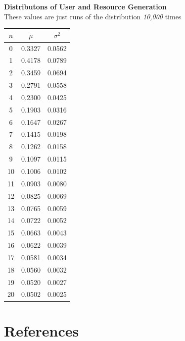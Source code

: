 \documentclass[12pt,a4paper]{report}
\begin{document}
\begin{center}
\large
\textup{\textbf{Distributons of User and Resource Generation\\}}
\normalsize
\textup{These values are just runs of the distribution \emph{10,000} times}
\begin{tabular}{|c|c|c|}
\hline
\textbf{$n$} & \textbf{$\mu$} & \textbf{$\sigma^2$} \\
\hline
0 & 0.3327 & 0.0562\\
\hline
1 & 0.4178 & 0.0789 \\
\hline
2 & 0.3459 & 0.0694 \\
\hline
3 & 0.2791 & 0.0558 \\
\hline
4 & 0.2300 & 0.0425 \\
\hline
5 & 0.1903 & 0.0316 \\
\hline
6 & 0.1647 & 0.0267 \\
\hline
7 & 0.1415 & 0.0198 \\
\hline
8 & 0.1262 & 0.0158 \\
\hline
9 & 0.1097 & 0.0115 \\
\hline
10 & 0.1006 & 0.0102 \\
\hline
11 & 0.0903 & 0.0080 \\
\hline
12 & 0.0825 & 0.0069 \\
\hline
13 & 0.0765 & 0.0059 \\
\hline
14 & 0.0722 & 0.0052 \\
\hline
15 & 0.0663 & 0.0043 \\
\hline
16 & 0.0622 & 0.0039 \\
\hline
17 & 0.0581 & 0.0034 \\
\hline
18 & 0.0560 & 0.0032 \\
\hline
19 & 0.0520 & 0.0027 \\
\hline
20 & 0.0502 & 0.0025 \\
\hline
\end{tabular}
\end{center}

\clearpage

\chapter{References}
\end{document}
